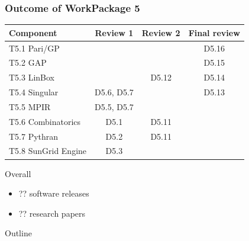 \documentclass{beamer}
\begin{document}
\begin{frame}
  \frametitle{Outcome of WorkPackage 5}

  \begin{tabular}{lccc}
    \toprule
    Component & Review 1 & Review 2 & Final review\\
    \midrule
    T5.1 Pari/GP & & & {\color{green} D5.16} \\
    T5.2 GAP     & & & {\color{green} D5.15} \\
    T5.3 LinBox  & & \alert{D5.12} & {\color{green} D5.14} \\
    T5.4 Singular& D5.6, D5.7 & & {\color{green} D5.13} \\
    T5.5 MPIR    & D5.5, D5.7& & \\
    T5.6 Combinatorics  & D5.1& \alert{D5.11} & \\
    T5.7 Pythran        & D5.2 & \alert{D5.11} & \\
    T5.8 SunGrid Engine & D5.3 & & \\
    \bottomrule
    
  \end{tabular}

  \vspace{1em}
  
  Overall
  \begin{itemize}
  \item ?? software releases
  \item ?? research papers
  \end{itemize}
\end{frame}

\begin{frame}
  {Outline}
  \tableofcontents
\end{frame}

\end{document}
